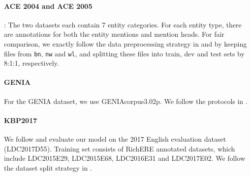 \documentclass[11pt,a4paper]{article}
\begin{document}
\paragraph{ACE 2004 and ACE 2005}\cite{ace2004ner, ace2005ner}:
The two datasets each contain 7 entity categories. 
For each entity type, there are annotations for
both
 the entity mentions and mention heads. 
For fair comparison, 
we exactly follow the data preprocessing strategy in  and  by keeping files from \texttt{bn}, \texttt{nw} and \texttt{wl},  and splitting these files into train, dev and test sets  by 8:1:1, respectively. 


\paragraph{GENIA} \cite{genia} For the GENIA dataset, we use GENIAcorpus3.02p.
We follow the protocols in .



\paragraph{KBP2017} We follow  and evaluate our model on the 2017 English evaluation dataset (LDC2017D55). 
Training set consists of RichERE annotated datasets, which include LDC2015E29, LDC2015E68, LDC2016E31 and LDC2017E02. 
We follow 
 the dataset split strategy in  .   
\end{document}
